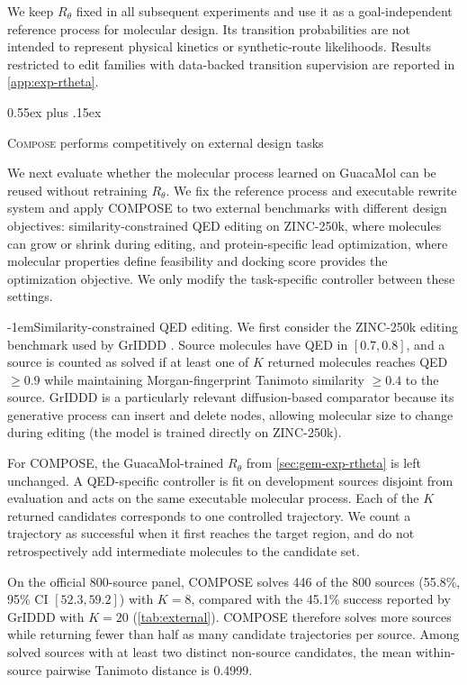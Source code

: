 \documentclass{article}
\makeatletter
\theoremstyle{definition}
\theoremstyle{remark}
\newcommand{\method}{\textsc{Compose}\xspace}
\def\subsection{\@startsection{subsection}{2}{\z@}{-1.2ex plus -0.4ex minus -.2ex}%
  {0.55ex plus .15ex}{\normalsize\sc\raggedright}}
\def\paragraph{\@startsection{paragraph}{4}{\z@}{1.0ex plus 0.3ex minus .2ex}%
  {-1em}{\normalsize\bf}}
\makeatother
\begin{document}
We keep $R_\theta$ fixed in all subsequent experiments and use it as a
goal-independent reference process for molecular design. Its transition
probabilities are not intended to represent physical kinetics or synthetic-route
likelihoods. Results restricted to edit families with data-backed transition
supervision are reported in \cref{app:exp-rtheta}.

\subsection{\method{} performs competitively on external design tasks}
\label{sec:gem-exp-external}

We next evaluate whether the molecular process learned on GuacaMol can be reused
without retraining $R_\theta$. We fix the reference process and executable
rewrite system and apply COMPOSE to two external benchmarks with different
design objectives: similarity-constrained QED editing on ZINC-250k, where
molecules can grow or shrink during editing, and protein-specific lead
optimization, where molecular properties define feasibility and docking score
provides the optimization objective. We only modify the task-specific controller
between these settings.

\paragraph{Similarity-constrained QED editing.}
We first consider the ZINC-250k editing benchmark used by GrIDDD
\citep{ninniri2025griddd}. Source molecules have QED in $[0.7,0.8]$, and a source
is counted as solved if at least one of $K$ returned molecules reaches QED
$\geq 0.9$ while maintaining Morgan-fingerprint Tanimoto similarity $\geq 0.4$ to
the source. GrIDDD is a particularly relevant diffusion-based comparator because its generative
process can insert and delete nodes, allowing molecular size to change during
editing (the model is trained directly on ZINC-250k).

For COMPOSE, the GuacaMol-trained $R_\theta$ from \cref{sec:gem-exp-rtheta} is
left unchanged. A QED-specific controller is fit on development sources disjoint
from evaluation and acts on the same executable molecular process. Each of the
$K$ returned candidates corresponds to one controlled trajectory. We count a
trajectory as successful when it first reaches the target region, and do not
retrospectively add intermediate molecules to the candidate set.

On the official 800-source panel, COMPOSE solves 446 of the 800 sources
(55.8\%, 95\% CI $[52.3,59.2]$) with $K=8$, compared with the 45.1\% success
reported by GrIDDD with $K=20$ (\cref{tab:external}). COMPOSE therefore solves
more sources while returning fewer than half as many candidate trajectories per
source. Among solved sources with at least two distinct non-source candidates,
the mean within-source pairwise Tanimoto distance is 0.4999.
\end{document}
